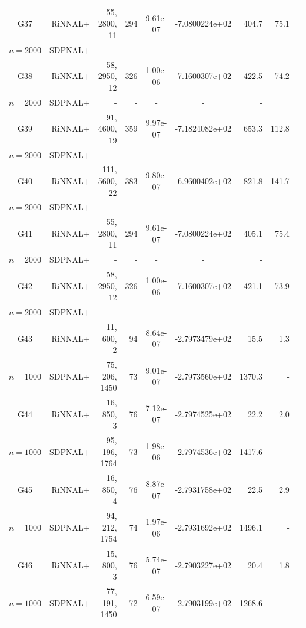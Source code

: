 \documentclass[11pt]{article}
\theoremstyle{plain}
\begin{document}
\begin{footnotesize}
\begin{longtable}[c]{crrrccrrr}
G37& RiNNAL+ & 55, 2800, 11 & 294 & 9.61e-07 & -7.0800224e+02 & 404.7 &75.1 \\ 
$n=2000$ & SDPNAL+ & - & - & - & - & - \\ [3pt] 

G38& RiNNAL+ & 58, 2950, 12 & 326 & 1.00e-06 & -7.1600307e+02 & 422.5 &74.2 \\ 
$n=2000$ & SDPNAL+ & - & - & - & - & - \\ [3pt] 

G39& RiNNAL+ & 91, 4600, 19 & 359 & 9.97e-07 & -7.1824082e+02 & 653.3 &112.8 \\ 
$n=2000$ & SDPNAL+ & - & - & - & - & - \\ [3pt] 

G40& RiNNAL+ & 111, 5600, 22 & 383 & 9.80e-07 & -6.9600402e+02 & 821.8 &141.7 \\ 
$n=2000$ & SDPNAL+ & - & - & - & - & - \\ [3pt] 

G41& RiNNAL+ & 55, 2800, 11 & 294 & 9.61e-07 & -7.0800224e+02 & 405.1 &75.4 \\ 
$n=2000$ & SDPNAL+ & - & - & - & - & - \\ [3pt] 

G42& RiNNAL+ & 58, 2950, 12 & 326 & 1.00e-06 & -7.1600307e+02 & 421.1 &73.9 \\ 
$n=2000$ & SDPNAL+ & - & - & - & - & - \\ [3pt] 

G43& RiNNAL+ & 11, 600, 2 & 94 & 8.64e-07 & -2.7973479e+02 & 15.5 &1.3 \\ 
$n=1000$ & SDPNAL+ & 75, 206, 1450 & 73& 9.01e-07 & -2.7973560e+02 & 1370.3 & - \\ [3pt] 

G44& RiNNAL+ & 16, 850, 3 & 76 & 7.12e-07 & -2.7974525e+02 & 22.2 &2.0 \\ 
$n=1000$ & SDPNAL+ & 95, 196, 1764 & 73& 1.98e-06 & -2.7974536e+02 & 1417.6 & - \\ [3pt] 

G45& RiNNAL+ & 16, 850, 4 & 76 & 8.87e-07 & -2.7931758e+02 & 22.5 &2.9 \\ 
$n=1000$ & SDPNAL+ & 94, 212, 1754 & 74& 1.97e-06 & -2.7931692e+02 & 1496.1 & - \\ [3pt] 

G46& RiNNAL+ & 15, 800, 3 & 76 & 5.74e-07 & -2.7903227e+02 & 20.4 &1.8 \\ 
$n=1000$ & SDPNAL+ & 77, 191, 1450 & 72& 6.59e-07 & -2.7903199e+02 & 1268.6 & - \\ [3pt] 


\end{longtable}
\end{footnotesize}
\end{document}
